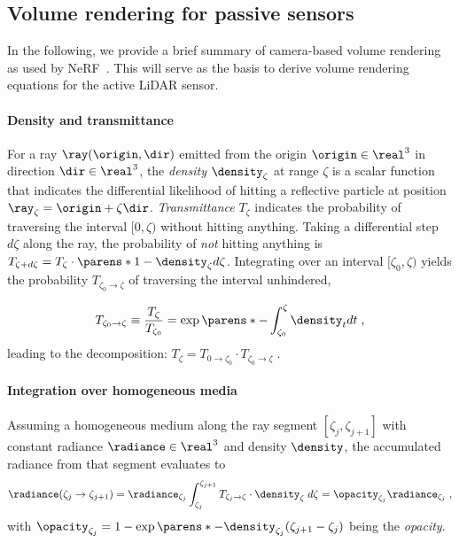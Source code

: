 \subsection{Volume rendering for passive sensors}
\label{sec:revisit_vr}
In the following, we provide a brief summary of camera-based volume rendering as used by NeRF~\cite{mildenhall2020nerf,tagliasacchi2022volume}. This will serve as the basis to derive volume rendering equations for the active LiDAR sensor.

\paragraph{Density and transmittance}
For a ray $\ray(\origin, \dir)$ emitted from the origin $\origin \in \real^3$ in direction $\dir \in \real^3$, the \textit{density} $\density_\zeta$ at range $\zeta$ is a scalar function that indicates the differential likelihood of hitting a reflective particle at position $\ray_\zeta = \origin + \zeta \dir$. \textit{Transmittance} $T_{\zeta}$ indicates the probability of traversing the interval $[0, \zeta)$ without hitting anything. Taking a differential step $d\zeta$ along the ray,  the probability of \emph{not} hitting anything is $T_{\zeta+d\zeta} = T_{\zeta} \cdot \parens*{1 -\density_\zeta d\zeta}$.
Integrating over an interval $[\zeta_0, \zeta)$ yields the probability $T_{\zeta_0 \rightarrow \zeta}$ of traversing the interval unhindered,

\begin{equation}
T_{\zeta_0 \rightarrow \zeta} \equiv \frac{T_{\zeta}}{T_{\zeta_0}} = \exp\parens*{-\int_{\zeta_0}^\zeta \density_t dt}\;,
\label{eq:trans_ab}
\end{equation}
leading to the decomposition: $T_{\zeta} = T_{0 \rightarrow \zeta_0} \cdot T_{\zeta_0 \rightarrow \zeta}\;.$
    


\paragraph{Integration over homogeneous media}
Assuming a homogeneous medium along the ray segment $[\zeta_j, \zeta_{j+1}]$ with constant radiance $\radiance \in \real^3$ and density $\density$, the accumulated radiance from that segment evaluates to 
\begin{equation}
    \radiance(\zeta_j \rightarrow \zeta_{j+1}) 
    = \radiance_{\zeta_j}\int_{\zeta_j}^{\zeta_{j+1}} T_{\zeta_j \rightarrow \zeta} \cdot \density_\zeta \; d\zeta
    = \opacity_{\zeta_j} \radiance_{\zeta_j}\;,
\end{equation}
with $\opacity_{\zeta_j}=1-\exp\parens*{{-\density_{\zeta_j}(\zeta_{j+1} - \zeta_j)}}$ being the \textit{opacity}. 

